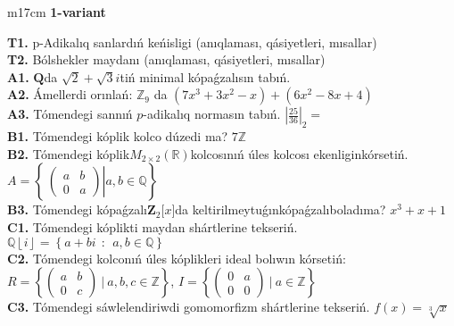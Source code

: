 \documentclass{article}
\begin{document}


\begin{tabular}{m{17cm}}
\textbf{1-variant}
\newline

\textbf{T1.} p-Adikalıq sanlardıń keńisligi (anıqlaması, qásiyetleri, mısallar) \\
\textbf{T2.} Bólshekler maydanı (anıqlaması, qásiyetleri, mısallar) \\
\textbf{A1.} \(\mathbf{Q}\)da \(\sqrt{2} + \sqrt{3}i\)tiń minimal kópaǵzalısın tabıń. \\
\textbf{A2.} Ámellerdi orınlań: \(\mathbb{Z}_{9}\) da \(\left( 7x^{3} + 3x^{2} - x \right) + \left( 6x^{2} - 8x + 4 \right)\) \\
\textbf{A3.} Tómendegi sannıń \(p\)-adikalıq normasın tabıń. \(|\frac{25}{36}|_{2} =\) \\
\textbf{B1.} Tómendegi kóplik kolco dúzedi ma? \(7\mathbb{Z}\) \\
\textbf{B2.} Tómendegi kóplik\(M_{2 \times 2}\left( \mathbb{R} \right)\)kolcosınıń úles kolcosı ekenliginkórsetiń. \(A = \left\{ \left. \ \begin{pmatrix}
a & b \\
0 & a
\end{pmatrix} \right|a,b\mathbb{\in Q} \right\}\) \\
\textbf{B3.} Tómendegi kópaǵzalı\(\mathbf{Z}_{2}\lbrack x\rbrack\)da keltirilmeytuǵınkópaǵzalıboladıma? \(x^{3} + x + 1\) \\
\textbf{C1.} Tómendegi kóplikti maydan shártlerine tekseriń. \(\mathbb{Q}\left\lfloor i \right\rfloor = \left\{ a + bi\ \ :\ \ a,b\mathbb{\in Q} \right\}\) \\
\textbf{C2.} Tómendegi kolconıń úles kóplikleri ideal bolıwın kórsetiń:
\(R = \left\{ \begin{pmatrix}
a & b \\
0 & c
\end{pmatrix}\ |\ a,b,c \in \mathbb{Z} \right\}\), \(I = \left\{ \begin{pmatrix}
0 & a \\
0 & 0
\end{pmatrix}\ |\ a \in \mathbb{Z} \right\}\) \\
\textbf{C3.} Tómendegi sáwlelendiriwdi gomomorfizm shártlerine tekseriń. \(f(x) = \sqrt[3]{x}\) \\

\end{tabular}
\vspace{1cm}
\end{document}
